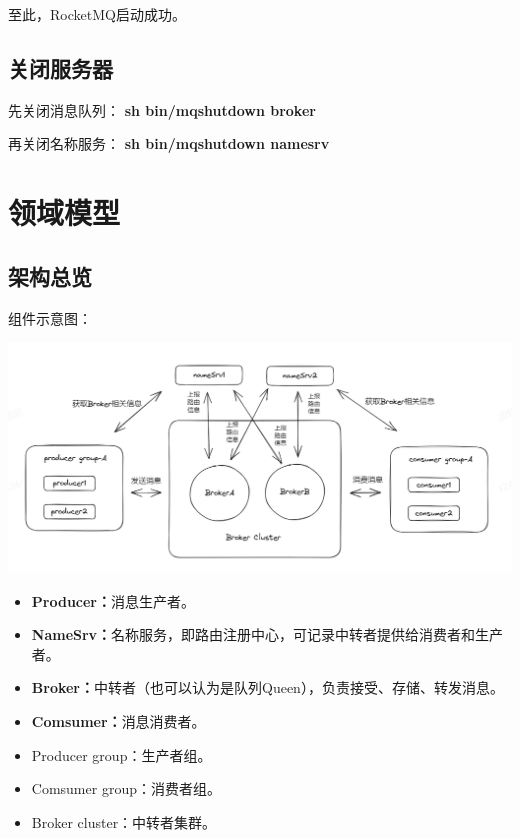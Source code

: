 \documentclass[11pt, a4paper, oneside, fontset=none]{ctexbook}
\begin{document}
至此，RocketMQ启动成功。

\section{关闭服务器}
先关闭消息队列：
{\bfseries\kaishu sh bin/mqshutdown broker}

再关闭名称服务：
{\bfseries\kaishu sh bin/mqshutdown namesrv}

\chapter{领域模型}
\section{架构总览}
组件示意图：
\begin{center}
  \begin{minipage}{\textwidth}
    \center
    \includegraphics[width=\textwidth]{picture/RocketMQ全局图.jpg}
    \captionsetup{hypcap=false}
    \label{fig:RocketMQ全局图}
  \end{minipage}
\end{center}

\begin{itemize}
  \item {\bfseries\kaishu Producer：}消息生产者。
  \item {\bfseries\kaishu NameSrv：}名称服务，即路由注册中心，可记录中转者提供给消费者和生产者。
  \item {\bfseries\kaishu Broker：}中转者（也可以认为是队列Queen），负责接受、存储、转发消息。
  \item {\bfseries\kaishu Comsumer：}消息消费者。
  \item Producer group：生产者组。
  \item Comsumer group：消费者组。
  \item Broker cluster：中转者集群。
\end{itemize}
\end{document}
